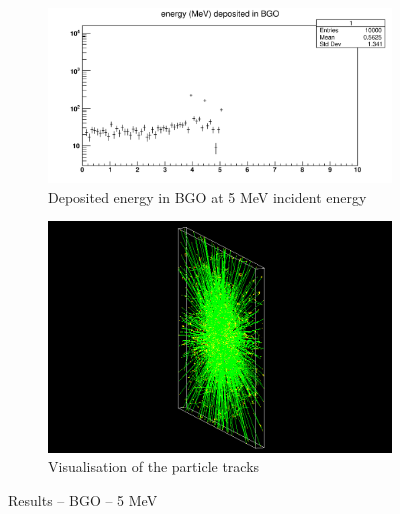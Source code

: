 \documentclass{article}
\begin{document}
\begin{figure}[H]
\centering
\begin{subfigure}{.5\textwidth}
  \centering
  \includegraphics[width=\linewidth]{images/task1/BGO_5MeV.png}
  \caption{Deposited energy in BGO at 5 MeV incident energy}
\end{subfigure}%
\begin{subfigure}{.5\textwidth}
  \centering
  \includegraphics[width=\linewidth]{images/task1/BGO_5MeV_10000.png}
  \caption{Visualisation of the particle tracks}
\end{subfigure}
\caption{Results – BGO – 5 MeV}
\end{figure}
\end{document}

